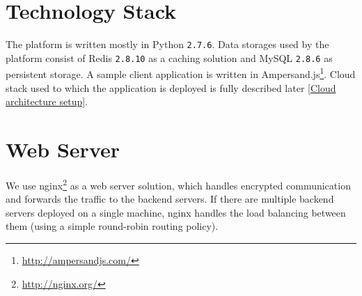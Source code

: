 \documentclass{uvamscse}
\begin{document}
\section{Technology Stack} \label{Technology Stack}

The platform is written mostly in Python \texttt{2.7.6}. Data storages used by the platform consist of Redis \texttt{2.8.10} as a caching solution and MySQL \texttt{2.8.6} as persistent storage. A sample client application is written in Ampersand.js\footnote{\url{http://ampersandjs.com/}}. Cloud stack used to which the application is deployed is fully described later \ref{Cloud architecture setup}.

\section{Web Server}

We use nginx\footnote{\url{http://nginx.org/}} as a web server solution, which handles encrypted communication and forwards the traffic to the backend servers. If there are multiple backend servers deployed on a single machine, nginx handles the load balancing between them (using a simple round-robin routing policy).


\end{document}
